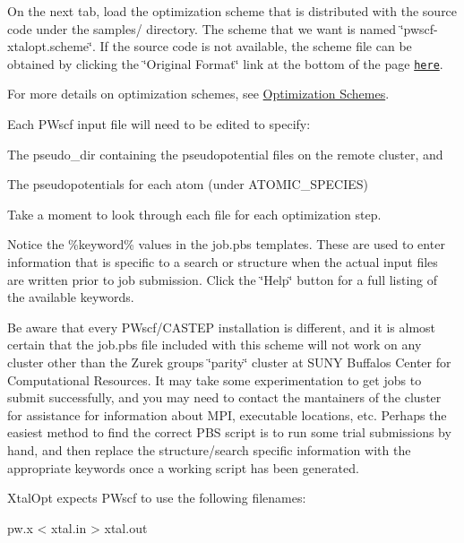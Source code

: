 On the next tab, load the optimization scheme that is distributed with the source code under the samples/ directory. The scheme that we want is named \char`\"{}pwscf-\/xtalopt.\+scheme\char`\"{}. If the source code is not available, the scheme file can be obtained by clicking the \char`\"{}\+Original Format\char`\"{} link at the bottom of the page \href{http://xtalopt.openmolecules.net/wiki/index.fcgi/browser/samples/pwscf-xtalopt.scheme}{\tt here}.

For more details on optimization schemes, see \hyperlink{optschemes}{Optimization Schemes}.

Each P\+Wscf input file will need to be edited to specify\+:
\begin{DoxyEnumerate}
\item The pseudo\+\_\+dir containing the pseudopotential files on the remote cluster, and
\item The pseudopotentials for each atom (under A\+T\+O\+M\+I\+C\+\_\+\+S\+P\+E\+C\+I\+E\+S)
\end{DoxyEnumerate}

Take a moment to look through each file for each optimization step.

Notice the \%keyword\% values in the job.\+pbs templates. These are used to enter information that is specific to a search or structure when the actual input files are written prior to job submission. Click the \char`\"{}\+Help\char`\"{} button for a full listing of the available keywords.

Be aware that every P\+Wscf/\+C\+A\+S\+T\+E\+P installation is different, and it is almost certain that the job.\+pbs file included with this scheme will not work on any cluster other than the Zurek group\textquotesingle{}s \char`\"{}parity\char`\"{} cluster at S\+U\+N\+Y Buffalo\textquotesingle{}s Center for Computational Resources. It may take some experimentation to get jobs to submit successfully, and you may need to contact the mantainers of the cluster for assistance for information about M\+P\+I, executable locations, etc. Perhaps the easiest method to find the correct P\+B\+S script is to run some trial submissions by hand, and then replace the structure/search specific information with the appropriate keywords once a working script has been generated.

Xtal\+Opt expects P\+Wscf to use the following filenames\+:


\begin{DoxyCode}
pw.x < xtal.in > xtal.out
\end{DoxyCode}



